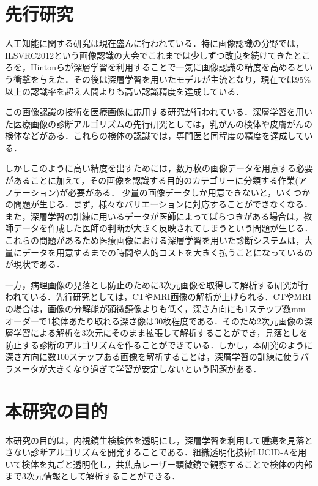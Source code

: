 \section{先行研究}\label{sec:先行研究}
人工知能に関する研究は現在盛んに行われている\cite{lecun2015deep, hoo2016deep}．特に画像認識の分野では，ILSVRC2012という画像認識の大会でこれまでは少しずつ改良を続けてきたところを，Hintonらが深層学習を利用することで一気に画像認識の精度を高めるという衝撃を与えた\cite{AlexNet}．その後は深層学習を用いたモデルが主流となり，現在では95\%以上の認識率を超え人間よりも高い認識精度を達成している\cite{ResNet}．

この画像認識の技術を医療画像に応用する研究が行われている\cite{inglese2017deep, hoo2016deep, havaei2017brain}．深層学習を用いた医療画像の診断アルゴリズムの先行研究としては，乳がん\cite{wang2016deep}の検体や皮膚がん\cite{esteva2017dermatologist}の検体などがある．これらの検体の認識では，専門医と同程度の精度を達成している．

しかしこのように高い精度を出すためには，数万枚の画像データを用意する必要があることに加えて，その画像を認識する目的のカテゴリーに分類する作業(アノテーション)が必要がある．
少量の画像データしか用意できないと，いくつかの問題が生じる．まず，様々なバリエーションに対応することができなくなる．また，深層学習の訓練に用いるデータが医師によってばらつきがある場合は，教師データを作成した医師の判断が大きく反映されてしまうという問題が生じる．これらの問題があるため医療画像における深層学習を用いた診断システムは，大量にデータを用意するまでの時間や人的コストを大きく払うことになっているのが現状である．

一方，病理画像の見落とし防止のために3次元画像を取得して解析する研究が行われている．先行研究としては，CT\cite{dou20163d}やMRI\cite{fmri}画像の解析が上げられる．CTやMRIの場合は，画像の分解能が顕微鏡像よりも低く，深さ方向にも1ステップ数mmオーダーで1検体あたり取れる深さ像は30枚程度である．そのため2次元画像の深層学習による解析を3次元にそのまま拡張して解析することができ，見落としを防止する診断のアルゴリズムを作ることができている．しかし，本研究のように深さ方向に数100ステップある画像を解析することは，深層学習の訓練に使うパラメータが大きくなり過ぎて学習が安定しないという問題がある．


\section{本研究の目的}
本研究の目的は，内視鏡生検検体を透明にし，深層学習を利用して腫瘍を見落とさない診断アルゴリズムを開発することである．組織透明化技術LUCID-Aを用いて検体を丸ごと透明化し，共焦点レーザー顕微鏡で観察することで検体の内部まで3次元情報として解析することができる．

